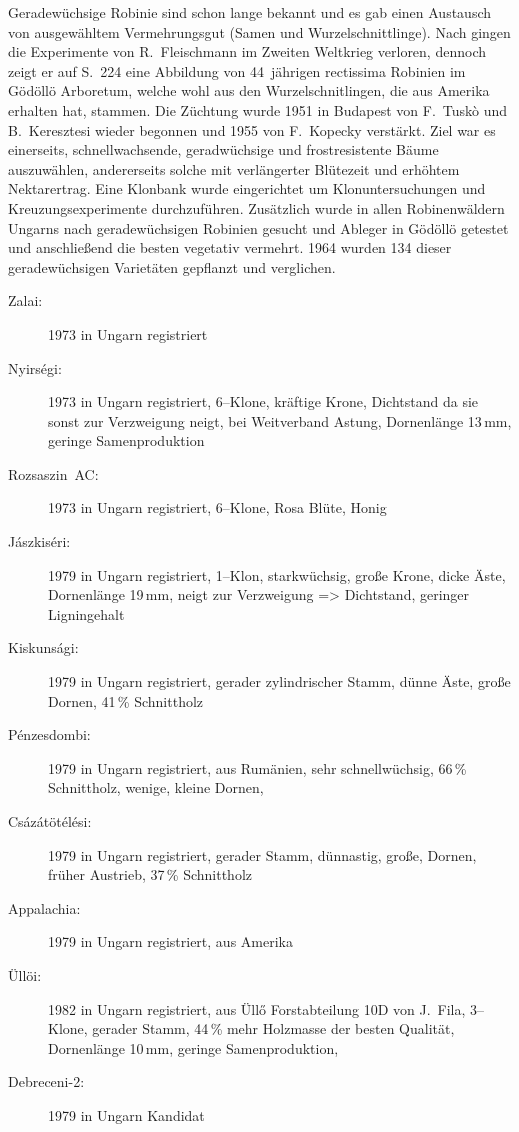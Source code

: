 \documentclass[twocolumn]{scrartcl}
\begin{document}
Geradewüchsige Robinie sind schon lange bekannt und es gab einen
Austausch von ausgewähltem Vermehrungsgut (Samen und
Wurzelschnittlinge). Nach \citep{keresztesi1983robinie} gingen die
Experimente von R.~Fleischmann im Zweiten Weltkrieg verloren, dennoch
zeigt er auf S.~224 eine Abbildung von 44~jährigen rectissima Robinien
im Gödöllö Arboretum, welche wohl aus den Wurzelschnitlingen, die
\cite{mihalyi1937robinie} aus Amerika erhalten hat, stammen. Die
Züchtung wurde 1951 in Budapest von F.~Tuskò und B.~Keresztesi wieder
begonnen und 1955 von F.~Kopecky verstärkt. Ziel war es einerseits, schnellwachsende,
geradwüchsige und frostresistente Bäume auszuwählen, andererseits solche mit
verlängerter Blütezeit und erhöhtem Nektarertrag.
Eine Klonbank wurde eingerichtet um Klonuntersuchungen
und Kreuzungsexperimente durchzuführen. Zusätzlich wurde in allen
Robinenwäldern Ungarns nach geradewüchsigen Robinien gesucht und
Ableger in Gödöllö getestet und anschließend die besten vegetativ
vermehrt. 1964 wurden 134 dieser geradewüchsigen Varietäten gepflanzt
und verglichen.

\begin{description}
  \item[Zalai:] 1973 in Ungarn registriert \citep{keresztesi1983robinie}
  \item[Nyirségi:] 1973 in Ungarn registriert, 6--Klone, kräftige Krone, Dichtstand da sie sonst zur Verzweigung neigt, bei Weitverband Astung, Dornenlänge 13\,mm, geringe Samenproduktion \citep{keresztesi1983robinie,kapusi1995robinie,abri2024dis}
  \item[Rozsaszin~AC:] 1973 in Ungarn registriert, 6--Klone, Rosa Blüte, Honig \citep{keresztesi1983robinie,kapusi1995robinie}
  \item[Jászkiséri:] 1979 in Ungarn registriert, 1--Klon, starkwüchsig, große Krone, dicke Äste, Dornenlänge 19\,mm, neigt zur Verzweigung => Dichtstand, geringer Ligningehalt \citep{keresztesi1983robinie,zsombor1980robinie,kapusi1995robinie,abri2024dis}
  \item[Kiskunsági:] 1979 in Ungarn registriert, gerader zylindrischer Stamm, dünne Äste, große Dornen, 41\,\% Schnittholz \citep{keresztesi1983robinie,zsombor1980robinie}
  \item[Pénzesdombi:] 1979 in Ungarn registriert, aus Rumänien, sehr schnellwüchsig, 66\,\% Schnittholz, wenige, kleine Dornen, \cite{zsombor1980robinie}
  \item[Csázátötélési:] 1979 in Ungarn registriert, gerader Stamm, dünnastig, große, Dornen, früher Austrieb, 37\,\% Schnittholz \citep{zsombor1980robinie}
  \item[Appalachia:] 1979 in Ungarn registriert, aus Amerika
  \item[Üllöi:] 1982 in Ungarn registriert, aus Üllő Forstabteilung 10D von J.~Fila, 3--Klone, gerader Stamm, 44\,\% mehr Holzmasse der besten Qualität, Dornenlänge 10\,mm, geringe Samenproduktion, \citep{bach1983robinie,kapusi1995robinie,abri2024dis,redei2020ulloi}
  \item[Debreceni-2:] 1979 in Ungarn Kandidat \citep{keresztesi1983robinie}
\end{description}
\end{document}

